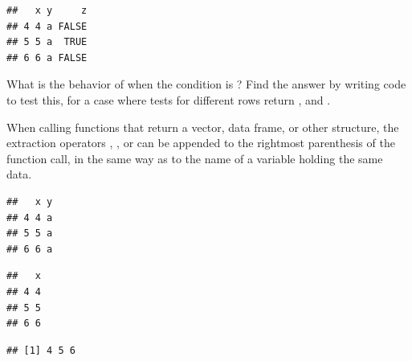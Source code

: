 \documentclass[krantz2]{krantz}\usepackage{knitr}
\begin{document}
\begin{knitrout}\footnotesize
{}\color{fgcolor}\begin{kframe}
\begin{alltt}
 \hlkwb{<-} \hlstd{(} \hlstd{=} \hlopt{:}\hlstd{,}  \hlstd{=} \hlstd{,}  \hlstd{=} \hlstd{(}\hlstd{,} \hlstd{))}
 \hlopt{>} \hlstd{)}
\end{alltt}
\begin{verbatim}
##   x y     z
## 4 4 a FALSE
## 5 5 a  TRUE
## 6 6 a FALSE
\end{verbatim}
\end{kframe}
\end{knitrout}

\begin{playground}
What is the behavior of  when the condition is ? Find the answer by writing code to test this, for a case where tests for different rows return ,  and .
\end{playground}

When calling functions that return a vector, data frame, or other structure, the extraction operators \Roperator{[ ]}, \Roperator{[[ ]]}, or \Roperator{\$} can be appended to the rightmost parenthesis of the function call, in the same way as to the name of a variable holding the same data.

\begin{knitrout}\footnotesize
{}\color{fgcolor}\begin{kframe}
\begin{alltt}
 \hlopt{>} \hlstd{)[ ,} \hlopt{-}\hlstd{]}
\end{alltt}
\begin{verbatim}
##   x y
## 4 4 a
## 5 5 a
## 6 6 a
\end{verbatim}
\begin{alltt}
 \hlopt{>} \hlstd{)[ ,} \hlstd{,}  \hlstd{=} \hlstd{]}
\end{alltt}
\begin{verbatim}
##   x
## 4 4
## 5 5
## 6 6
\end{verbatim}
\begin{alltt}
 \hlopt{>} \hlstd{)[ ,} \hlstd{]}
\end{alltt}
\begin{verbatim}
## [1] 4 5 6
\end{verbatim}
\end{kframe}
\end{knitrout}
\end{document}
